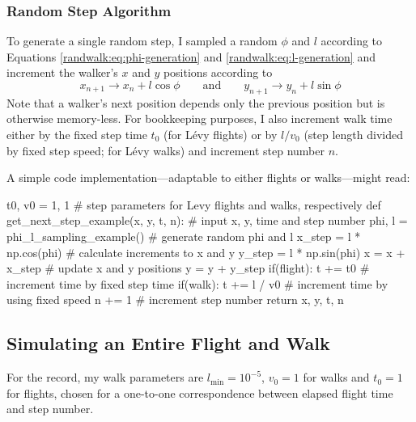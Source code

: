 \documentclass[11pt, a4paper]{article}
\newcommand{\eqtext}[1]{\qquad \text{#1} \qquad}
\newcommand{\lev}{L\'evy\xspace}
\begin{document}
\subsubsection{Random Step Algorithm} \label{randwalk:sss:random_step_algorithm}
To generate a single random step, I sampled a random $ \phi $ and $ l $ according to Equations \ref{randwalk:eq:phi-generation} and \ref{randwalk:eq:l-generation} and increment the walker's $ x $ and $ y $ positions according to
\begin{equation*}
	x_{n + 1} \to x_{n} + l \cos \phi \eqtext{and} y_{n + 1} \to y_{n} + l \sin \phi
\end{equation*}
Note that a walker's next position depends only the previous position but is otherwise memory-less. For bookkeeping purposes, I also increment walk time either by the fixed step time $ t_{0} $ (for \lev flights) or by $ l/v_{0} $ (step length divided by fixed step speed; for \lev walks) and increment step number $ n $.

A simple code implementation---adaptable to either flights or walks---might read:
\begin{myminted}
t0, v0 = 1, 1   # step parameters for Levy flights and walks, respectively
def get_next_step_example(x, y, t, n): # input x, y, time and step number
    phi, l = phi_l_sampling_example()  # generate random phi and l
    x_step = l * np.cos(phi)           # calculate increments to x and y
    y_step = l * np.sin(phi)
    x = x + x_step                     # update x and y positions
    y = y + y_step
    if(flight): t += t0                # increment time by fixed step time
    if(walk): t += l / v0              # increment time by using fixed speed
    n += 1                             # increment step number
    return x, y, t, n
\end{myminted}

\subsection{Simulating an Entire Flight and Walk} \label{randwalk:ss:walk simulation}
For the record, my walk parameters are $ l_{\text{min}} = 10^{-5} $, $ v_{0} = 1 $ for walks and $ t_{0} = 1 $ for flights, chosen for a one-to-one correspondence between elapsed flight time and step number.
\end{document}
